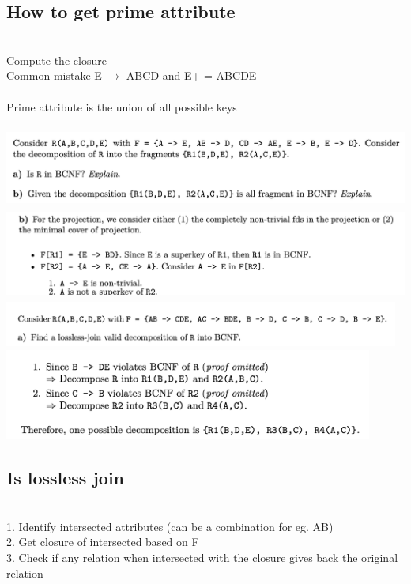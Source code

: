\documentclass[11pt]{article}
\begin{document}
\begin{multicols*}{3}
\subsection*{How to get prime attribute}\\
Compute the closure\\
Common mistake E $\rightarrow$ ABCD and E+ = ABCDE\\
\\
Prime attribute is the union of all possible keys
\\
\\
\includegraphics[height=2.5cm]{images/b3}\\
\includegraphics[height=3cm]{images/b4}
\vspace{0.5cm}
\\
\includegraphics[height=1.5cm]{images/b7}\\
\includegraphics[height=3cm]{images/b6}
\\
\subsection*{Is lossless join}\\
1. Identify intersected attributes (can be a combination for eg. AB)\\
2. Get closure of intersected based on F\\
3. Check if any relation when intersected with the closure gives back the original relation
\\

\end{multicols*}
\end{document}
